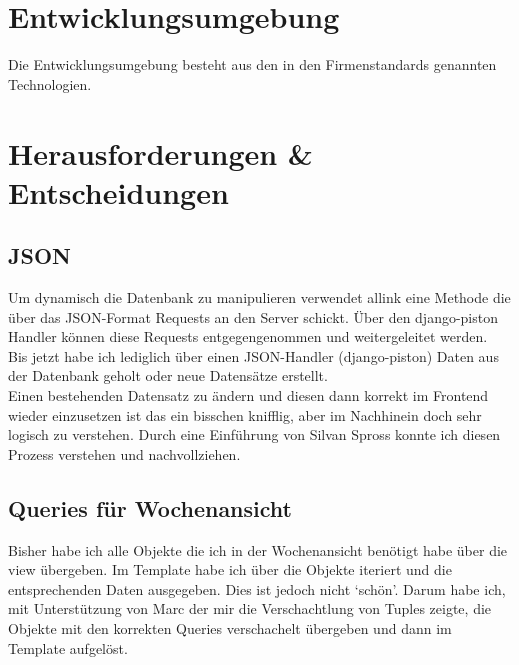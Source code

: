 \section{Entwicklungsumgebung}
Die Entwicklungsumgebung besteht aus den in den Firmenstandards genannten Technologien.
\section{Herausforderungen \& Entscheidungen}
\subsection{JSON}
Um dynamisch die Datenbank zu manipulieren verwendet allink eine Methode die über das JSON-Format Requests an den Server schickt. 
Über den django-piston Handler können diese Requests entgegengenommen und weitergeleitet werden.\\
Bis jetzt habe ich lediglich über einen JSON-Handler (django-piston) Daten aus der Datenbank geholt oder neue Datensätze erstellt.\\
Einen bestehenden Datensatz zu ändern und diesen dann korrekt im Frontend wieder einzusetzen ist das ein bisschen knifflig, aber im Nachhinein doch sehr logisch zu verstehen.
Durch eine Einführung von Silvan Spross konnte ich diesen Prozess verstehen und nachvollziehen.
\subsection{Queries für Wochenansicht}
Bisher habe ich alle Objekte die ich in der Wochenansicht benötigt habe über die view übergeben.
Im Template habe ich über die Objekte iteriert und die entsprechenden Daten ausgegeben. Dies ist jedoch nicht `schön'. 
Darum habe ich, mit Unterstützung von Marc der mir die Verschachtlung von Tuples zeigte, die Objekte mit den korrekten Queries verschachelt übergeben und dann im Template aufgelöst.
